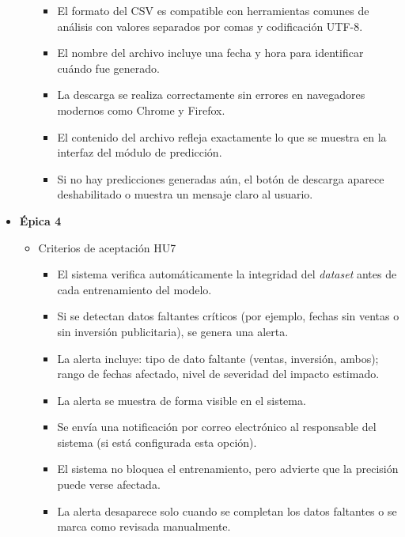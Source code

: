 \documentclass[
11pt, %
]{charter}
\begin{document}
\begin{itemize}
\begin{itemize}
\begin{itemize}
      \item El formato del CSV es compatible con herramientas comunes de análisis con valores separados por comas y codificación UTF-8.

      \item El nombre del archivo incluye una fecha y hora para identificar cuándo fue generado.

      \item La descarga se realiza correctamente sin errores en navegadores modernos como Chrome y Firefox.

      \item El contenido del archivo refleja exactamente lo que se muestra en la interfaz del módulo de predicción.

      \item Si no hay predicciones generadas aún, el botón de descarga aparece deshabilitado o muestra un mensaje claro al usuario.
    \end{itemize}
    \end{itemize}
  \item \textbf{\'{E}pica 4}
    \begin{itemize}
      \item Criterios de aceptación HU7
      
    \begin{itemize}
      \item El sistema verifica automáticamente la integridad del \textit{dataset} antes de cada entrenamiento del modelo.

      \item Si se detectan datos faltantes críticos (por ejemplo, fechas sin ventas o sin inversión publicitaria), se genera una alerta.

      \item La alerta incluye: tipo de dato faltante (ventas, inversión, ambos); rango de fechas afectado, nivel de severidad del impacto estimado.

      \item La alerta se muestra de forma visible en el sistema.

      \item Se envía una notificación por correo electrónico al responsable del sistema (si está configurada esta opción).

      \item El sistema no bloquea el entrenamiento, pero advierte que la precisión puede verse afectada.

      \item La alerta desaparece solo cuando se completan los datos faltantes o se marca como revisada manualmente.


\end{itemize}
\end{itemize}
\end{itemize}
\end{document}
